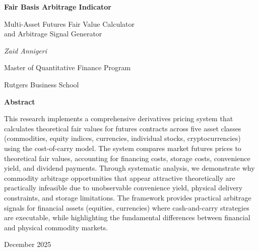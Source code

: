 \documentclass[12pt,a4paper]{article}
\begin{document}
\begin{titlepage}
    \centering
    \vspace*{2cm}

    {\Huge\bfseries Fair Basis Arbitrage Indicator\par}
    \vspace{0.5cm}
    {\Large Multi-Asset Futures Fair Value Calculator \\ and Arbitrage Signal Generator\par}

    \vspace{2cm}

    {\Large\itshape Zaid Annigeri\par}
    \vspace{0.5cm}
    {\large Master of Quantitative Finance Program\par}
    {\large Rutgers Business School\par}

    \vfill

    {\large \textbf{Abstract}\par}
    \vspace{0.5cm}
    \begin{minipage}{0.8\textwidth}
        \small
        This research implements a comprehensive derivatives pricing system that calculates theoretical fair values for futures contracts across five asset classes (commodities, equity indices, currencies, individual stocks, cryptocurrencies) using the cost-of-carry model. The system compares market futures prices to theoretical fair values, accounting for financing costs, storage costs, convenience yield, and dividend payments. Through systematic analysis, we demonstrate why commodity arbitrage opportunities that appear attractive theoretically are practically infeasible due to unobservable convenience yield, physical delivery constraints, and storage limitations. The framework provides practical arbitrage signals for financial assets (equities, currencies) where cash-and-carry strategies are executable, while highlighting the fundamental differences between financial and physical commodity markets.
    \end{minipage}

    \vfill

    {\large December 2025\par}
\end{titlepage}
\end{document}
